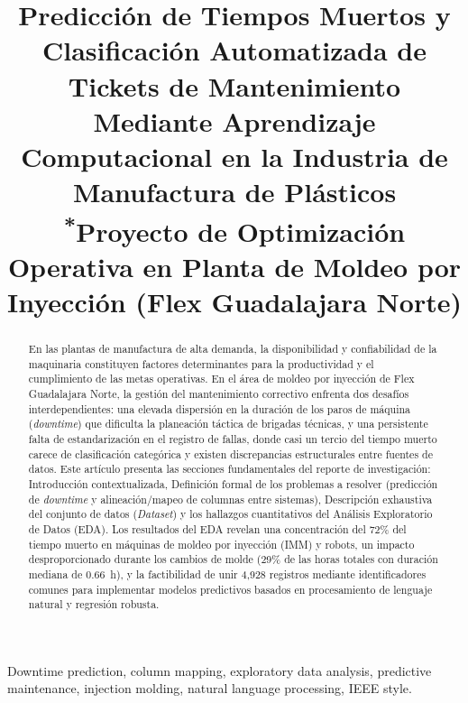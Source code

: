 \documentclass[conference]{IEEEtran}
\begin{document}
\title{Predicción de Tiempos Muertos y Clasificación Automatizada de Tickets de Mantenimiento Mediante Aprendizaje Computacional en la Industria de Manufactura de Plásticos\\
{\footnotesize \textsuperscript{*}Proyecto de Optimización Operativa en Planta de Moldeo por Inyección (Flex Guadalajara Norte)}}

\author{
}

\maketitle

\begin{abstract}
En las plantas de manufactura de alta demanda, la disponibilidad y confiabilidad de la maquinaria constituyen factores determinantes para la productividad y el cumplimiento de las metas operativas. En el área de moldeo por inyección de Flex Guadalajara Norte, la gestión del mantenimiento correctivo enfrenta dos desafíos interdependientes: una elevada dispersión en la duración de los paros de máquina (\textit{downtime}) que dificulta la planeación táctica de brigadas técnicas, y una persistente falta de estandarización en el registro de fallas, donde casi un tercio del tiempo muerto carece de clasificación categórica y existen discrepancias estructurales entre fuentes de datos. Este artículo presenta las secciones fundamentales del reporte de investigación: Introducción contextualizada, Definición formal de los problemas a resolver (predicción de \textit{downtime} y alineación/mapeo de columnas entre sistemas), Descripción exhaustiva del conjunto de datos (\textit{Dataset}) y los hallazgos cuantitativos del Análisis Exploratorio de Datos (EDA). Los resultados del EDA revelan una concentración del 72\% del tiempo muerto en máquinas de moldeo por inyección (IMM) y robots, un impacto desproporcionado durante los cambios de molde (29\% de las horas totales con duración mediana de 0.66~h), y la factibilidad de unir 4,928 registros mediante identificadores comunes para implementar modelos predictivos basados en procesamiento de lenguaje natural y regresión robusta.
\end{abstract}

\begin{IEEEkeywords}
Downtime prediction, column mapping, exploratory data analysis, predictive maintenance, injection molding, natural language processing, IEEE style.
\end{IEEEkeywords}
\end{document}
